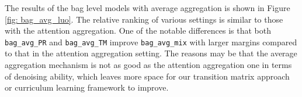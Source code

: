 The results of the bag level models with average aggregation is shown in Figure \ref{fig: bag_avg_luo}. The relative ranking of various settings is similar to those with the attention aggregation.
One of the notable differences is that both \texttt{bag\_avg\_PR} and \texttt{bag\_avg\_TM} improve \texttt{bag\_avg\_mix} with larger margins compared to that in the attention aggregation setting. The reasons may be that the average aggregation mechanism is not as good as the attention aggregation one in terms of denoising ability, which leaves more space for our transition matrix approach or curriculum learning framework to improve.

